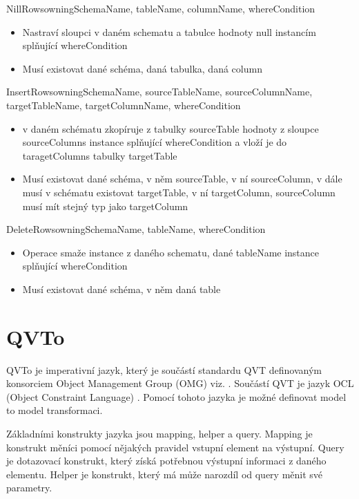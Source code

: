 \documentclass[11pt,twoside,a4paper]{book}
\begin{document}
\begin{list}{Operace :}{}
  \item NillRows{owningSchemaName, tableName, columnName, whereCondition}
  \begin{itemize}
    \item Nastraví sloupci v daném schematu a tabulce hodnoty null instancím
    splňující whereCondition
    \item Musí existovat dané schéma, daná tabulka, daná column
  \end{itemize}

  \item InsertRows{owningSchemaName, sourceTableName, sourceColumnName,
  targetTableName, targetColumnName, whereCondition}
  \begin{itemize}
    \item v daném schématu zkopíruje z tabulky sourceTable hodnoty z
    sloupce sourceColumns instance splňující whereCondition a vloží je do
    taragetColumns tabulky targetTable    
    \item Musí existovat dané schéma, v něm sourceTable, v ní sourceColumn, v
    dále musí v schématu existovat targetTable, v ní targetColumn, sourceColumn
    musí mít stejný typ jako targetColumn
  \end{itemize}

  \item DeleteRows{owningSchemaName, tableName, whereCondition}
  \begin{itemize}
    \item Operace smaže instance z daného schematu, dané tableName instance
    splňující whereCondition
    \item Musí existovat dané schéma, v něm daná table
  \end{itemize}

\end{list}

\section{QVTo}
QVTo je imperativní jazyk, který je součástí standardu QVT definovaným
konsorciem Object Management Group (OMG) viz. \cite{OMG}. Součástí QVT je
jazyk OCL (Object Constraint Language) \cite{OCL}. Pomocí tohoto jazyka je možné
definovat model to model transformaci.

Základními konstrukty jazyka jsou mapping, helper a query. Mapping je konstrukt
měníci pomocí nějakých pravidel vstupní element na výstupní. Query je
dotazovací konstrukt, který získá potřebnou výstupní informaci z daného
elementu. Helper je konstrukt, který má může narozdíl od query měnit své parametry.
\end{document}
